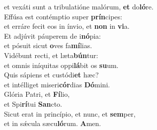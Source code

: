 \oddverse et vexáti sunt a tribulatióne malórum, \textbf{et} do\textbf{ló}re.\\
\evenverse Effúsa est contémptio super \textbf{prín}cipes:~\*\\
\evenverse et erráre fecit eos in ínvio, et \textbf{non} in \textbf{vi}a.\\
\oddverse Et adjúvit páuperem de i\textbf{nó}pia:~\*\\
\oddverse et pósuit sicut \textbf{o}ves fa\textbf{mí}lias.\\
\evenverse Vidébunt recti, et læta\textbf{bún}tur:~\*\\
\evenverse et omnis iníquitas oppi\textbf{lá}bit os \textbf{su}um.\\
\oddverse Quis sápiens et custódi\textbf{et} hæc?~\*\\
\oddverse et intélliget miseri\textbf{cór}dias \textbf{Dó}mini.\\
\evenverse Glória Patri, et \textbf{Fí}lio,~\*\\
\evenverse et Spi\textbf{rí}tui \textbf{San}cto.\\
\oddverse Sicut erat in princípio, et nunc, et \textbf{sem}per,~\*\\
\oddverse et in sǽcula sæcu\textbf{ló}rum. \textbf{A}men.\\
